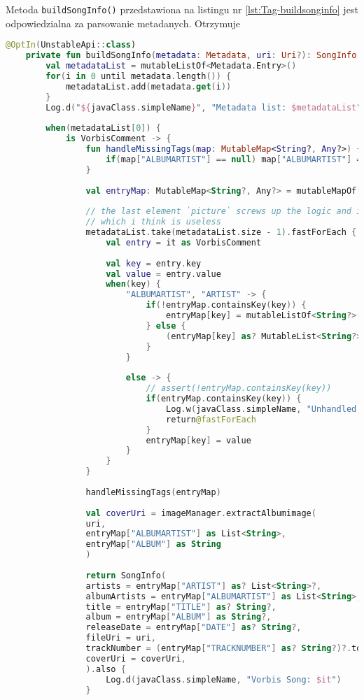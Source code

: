 Metoda \texttt{buildSongInfo()} przedstawiona na listingu nr \ref{lst:Tag-buildsonginfo} jest odpowiedzialna za parsowanie metadanych. Otrzymuje 

\begin{lstlisting}[caption=Metoda \texttt{buildSongInfo()}, label={lst:Tag-buildsonginfo}, language=kotlin]
	@OptIn(UnstableApi::class)
	private fun buildSongInfo(metadata: Metadata, uri: Uri?): SongInfo {
		val metadataList = mutableListOf<Metadata.Entry>()
		for(i in 0 until metadata.length()) {
			metadataList.add(metadata.get(i))
		}
		Log.d("${javaClass.simpleName}", "Metadata list: $metadataList")
		
		when(metadataList[0]) {
			is VorbisComment -> {
				fun handleMissingTags(map: MutableMap<String?, Any?>) {
					if(map["ALBUMARTIST"] == null) map["ALBUMARTIST"] = List<String>(1,{"Unknown"} )
				}
				
				val entryMap: MutableMap<String?, Any?> = mutableMapOf()
				
				// the last element `picture` screws up the logic and it only has a mimetype value
				// which i think is useless
				metadataList.take(metadataList.size - 1).fastForEach {
					val entry = it as VorbisComment
					
					val key = entry.key
					val value = entry.value
					when(key) {
						"ALBUMARTIST", "ARTIST" -> {
							if(!entryMap.containsKey(key)) {
								entryMap[key] = mutableListOf<String?>(value)
							} else {
								(entryMap[key] as? MutableList<String?>)?.add(value)
							}
						}
						
						else -> {
							// assert(!entryMap.containsKey(key))
							if(entryMap.containsKey(key)) {
								Log.w(javaClass.simpleName, "Unhandled duplicate key: $key")
								return@fastForEach
							}
							entryMap[key] = value
						}
					}
				}
				
				handleMissingTags(entryMap)
				
				val coverUri = imageManager.extractAlbumimage(
				uri,
				entryMap["ALBUMARTIST"] as List<String>,
				entryMap["ALBUM"] as String
				)
				
				return SongInfo(
				artists = entryMap["ARTIST"] as? List<String>?,
				albumArtists = entryMap["ALBUMARTIST"] as List<String>,
				title = entryMap["TITLE"] as? String?,
				album = entryMap["ALBUM"] as String?,
				releaseDate = entryMap["DATE"] as? String?,
				fileUri = uri,
				trackNumber = (entryMap["TRACKNUMBER"] as? String?)?.toInt(),
				coverUri = coverUri,
				).also {
					Log.d(javaClass.simpleName, "Vorbis Song: $it")
				}
				

\end{lstlisting}
